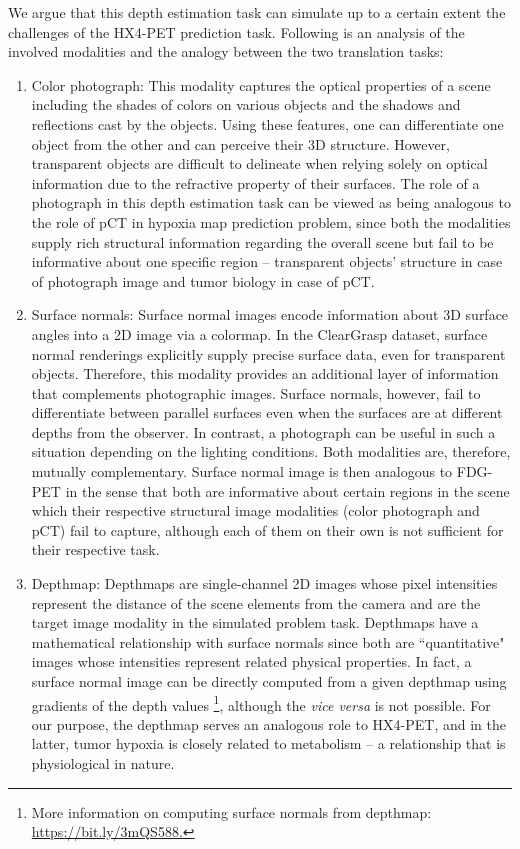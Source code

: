 We argue that this depth estimation task can simulate up to a certain extent the challenges of the HX4-PET prediction task. Following is an analysis of the involved modalities and the analogy between the two translation tasks:
 
\begin{enumerate}
    
    \item Color photograph: This modality captures the optical properties of a scene including the shades of colors on various objects and the shadows and reflections cast by the objects. Using these features, one can differentiate one object from the other and can perceive their 3D structure. However, transparent objects are difficult to delineate when relying solely on optical information due to the refractive property of their surfaces. The role of a photograph in this depth estimation task can be viewed as being analogous to the role of pCT in hypoxia map prediction problem, since both the modalities supply rich structural information regarding the overall scene but fail to be informative about one specific region -- transparent objects' structure in case of photograph image and tumor biology in case of pCT.
    
    \item Surface normals: Surface normal images encode information about 3D surface angles into a 2D image via a colormap. In the ClearGrasp dataset, surface normal renderings explicitly supply precise surface data, even for transparent objects. Therefore, this modality provides an additional layer of information that complements photographic images. Surface normals, however, fail to differentiate between parallel surfaces even when the surfaces are at different depths from the observer. In contrast, a photograph can be useful in such a situation depending on the lighting conditions. Both modalities are, therefore, mutually complementary. Surface normal image is then analogous to FDG-PET in the sense that both are informative about certain regions in the scene which their respective structural image modalities (color photograph and pCT) fail to capture, although each of them on their own is not sufficient for their respective task. 
    
    \item Depthmap: Depthmaps are single-channel 2D images whose pixel intensities represent the distance of the scene elements from the camera and are the target image modality in the simulated problem task. Depthmaps have a mathematical relationship with surface normals since both are ``quantitative" images whose intensities represent related physical properties. In fact, a surface normal image can be directly computed from a given depthmap using gradients of the depth values \footnote{More information on computing surface normals from depthmap: \url{https://bit.ly/3mQS588.}}, although the \textit{vice versa} is not possible. For our purpose, the depthmap serves an analogous role to HX4-PET, and in the latter, tumor hypoxia is closely related to metabolism -- a relationship that is physiological in nature.
    
\end{enumerate}

